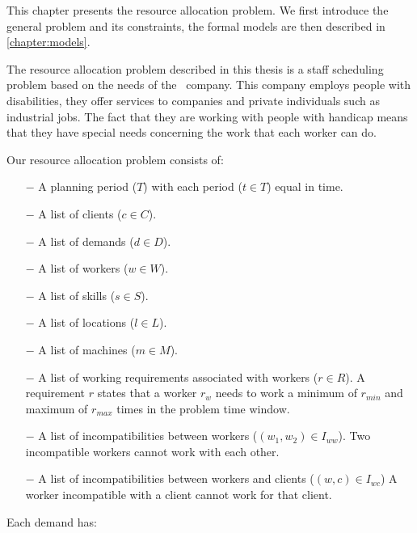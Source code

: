 \documentclass[../thesis.tex]{subfiles}
\begin{document}
This chapter presents the resource allocation problem.
We first introduce the general problem and its constraints, 
the formal models are then described in \autoref{chapter:models}.

The resource allocation problem described in this thesis is a staff scheduling problem based on the needs of the \vone\ company. 
This company employs people with disabilities, they offer services to companies and private individuals such 
as industrial jobs. The fact that they are working with people with handicap means that they have special needs concerning
the work that each worker can do.




Our resource allocation problem consists of:

\begin{itemize}
  \item[$-$] A planning period ($T$) with each period ($t \in T$) equal in time.
  \item[$-$] A list of clients ($c \in C$). 
  \item[$-$] A list of demands ($d \in D$).
  \item[$-$] A list of workers ($w \in W$). 
  \item[$-$] A list of skills ($s \in S$).
  \item[$-$] A list of locations ($l \in L$).
  \item[$-$] A list of machines ($m \in M$).
  \item[$-$] A list of working requirements associated with workers ($r \in R$). A requirement $r$ states that a worker $r_w$
  needs to work a minimum of $r_{min}$ and maximum of $r_{max}$ times in the problem time window.  
  \item[$-$] A list of incompatibilities between workers ($(w_1, w_2) \in I_{ww}$).
  Two incompatible workers cannot work with each other.  
  \item[$-$] A list of incompatibilities between workers and clients ($(w, c) \in I_{wc}$)
  A worker incompatible with a client cannot work for that client.
\end{itemize}

Each demand has:
\end{document}
